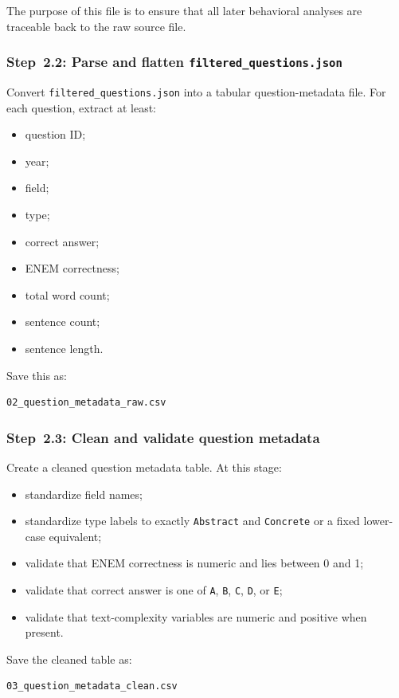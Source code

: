 \documentclass[11pt]{article}
\begin{document}
The purpose of this file is to ensure that all later behavioral analyses are traceable back to the raw source file.

\subsubsection{Step~2.2: Parse and flatten \texttt{filtered\_questions.json}}
Convert \texttt{filtered\_questions.json} into a tabular question-metadata file.
For each question, extract at least:
\begin{itemize}
    \item question ID;
    \item year;
    \item field;
    \item type;
    \item correct answer;
    \item ENEM correctness;
    \item total word count;
    \item sentence count;
    \item sentence length.
\end{itemize}

Save this as:
\begin{verbatim}
02_question_metadata_raw.csv
\end{verbatim}

\subsubsection{Step~2.3: Clean and validate question metadata}
Create a cleaned question metadata table.
At this stage:
\begin{itemize}
    \item standardize field names;
    \item standardize type labels to exactly \texttt{Abstract} and \texttt{Concrete} or a fixed lower-case equivalent;
    \item validate that ENEM correctness is numeric and lies between 0 and 1;
    \item validate that correct answer is one of \texttt{A}, \texttt{B}, \texttt{C}, \texttt{D}, or \texttt{E};
    \item validate that text-complexity variables are numeric and positive when present.
\end{itemize}

Save the cleaned table as:
\begin{verbatim}
03_question_metadata_clean.csv
\end{verbatim}
\end{document}
